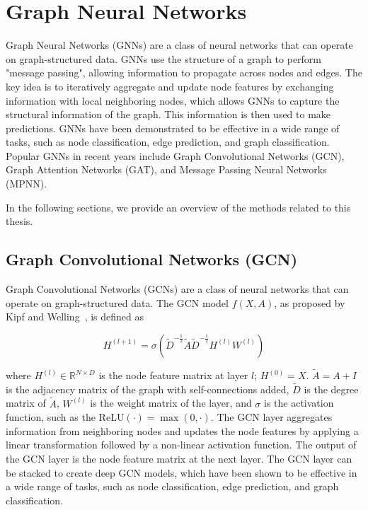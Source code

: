 \section{Graph Neural Networks}
Graph Neural Networks (GNNs) are a class of neural networks that can operate on graph-structured data. GNNs use the structure of a graph to perform "message passing", allowing information to propagate across nodes and edges. The key idea is to iteratively aggregate and update node features by exchanging information with local neighboring nodes, which allows GNNs to capture the structural information of the graph. This information is then used to make predictions. GNNs have been demonstrated to be effective in a wide range of tasks, such as node classification, edge prediction, and graph classification. Popular GNNs in recent years include Graph Convolutional Networks (GCN), Graph Attention Networks (GAT), and Message Passing Neural Networks (MPNN).

In the following sections, we provide an overview of the methods related to this thesis.

\subsection{Graph Convolutional Networks (GCN)}

Graph Convolutional Networks (GCNs) are a class of neural networks that can operate on graph-structured data. The GCN model $f(X, A)$, as proposed by Kipf and Welling~\cite{kipf2016semi}, is defined as

$$ 
 H^{(l+1)} = \sigma(\tilde{D}^{-\frac{1}{2}}\tilde{A}\tilde{D}^{-\frac{1}{2}}H^{(l)}W^{(l)})
$$

where $H^{(l)}\in \mathbb{R}^{N\times D}$ is the node feature matrix at layer $l$; $H^{(0)} = X$. $\tilde{A} = A + I$ is the adjacency matrix of the graph with self-connections added, $\tilde{D}$ is the degree matrix of $\tilde{A}$, $W^{(l)}$ is the weight matrix of the layer, and $\sigma$ is the activation function, such as the $\textrm{ReLU}(\cdot)=\max(0,\cdot)$. The GCN layer aggregates information from neighboring nodes and updates the node features by applying a linear transformation followed by a non-linear activation function. The output of the GCN layer is the node feature matrix at the next layer. The GCN layer can be stacked to create deep GCN models, which have been shown to be effective in a wide range of tasks, such as node classification, edge prediction, and graph classification.



